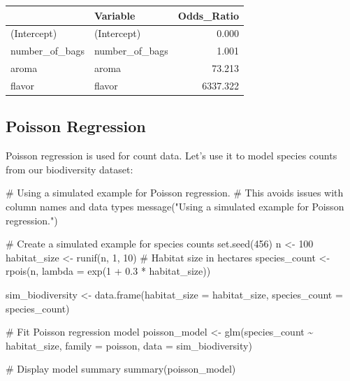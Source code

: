 \documentclass[
  letterpaper,
]{book}
\newenvironment{Shaded}{\begin{snugshade}}{\end{snugshade}}
\newcommand{\AttributeTok}[1]{\textcolor[rgb]{0.40,0.45,0.13}{#1}}
\newcommand{\CommentTok}[1]{\textcolor[rgb]{0.37,0.37,0.37}{#1}}
\newcommand{\DecValTok}[1]{\textcolor[rgb]{0.68,0.00,0.00}{#1}}
\newcommand{\FloatTok}[1]{\textcolor[rgb]{0.68,0.00,0.00}{#1}}
\newcommand{\FunctionTok}[1]{\textcolor[rgb]{0.28,0.35,0.67}{#1}}
\newcommand{\NormalTok}[1]{\textcolor[rgb]{0.00,0.23,0.31}{#1}}
\newcommand{\OtherTok}[1]{\textcolor[rgb]{0.00,0.23,0.31}{#1}}
\newcommand{\SpecialCharTok}[1]{\textcolor[rgb]{0.37,0.37,0.37}{#1}}
\newcommand{\StringTok}[1]{\textcolor[rgb]{0.13,0.47,0.30}{#1}}
\begin{document}
\begin{longtable}[]{@{}llr@{}}
\toprule\noalign{}
& Variable & Odds\_Ratio \\
\midrule\noalign{}
\endhead
\bottomrule\noalign{}
\endlastfoot
(Intercept) & (Intercept) & 0.000 \\
number\_of\_bags & number\_of\_bags & 1.001 \\
aroma & aroma & 73.213 \\
flavor & flavor & 6337.322 \\
\end{longtable}

\subsection{Poisson Regression}\label{poisson-regression}

Poisson regression is used for count data. Let's use it to model species
counts from our biodiversity dataset:

\begin{Shaded}
\begin{Highlighting}[]
\CommentTok{\# Using a simulated example for Poisson regression.}
\CommentTok{\# This avoids issues with column names and data types}
\FunctionTok{message}\NormalTok{(}\StringTok{"Using a simulated example for Poisson regression."}\NormalTok{)}

\CommentTok{\# Create a simulated example for species counts}
\FunctionTok{set.seed}\NormalTok{(}\DecValTok{456}\NormalTok{)}
\NormalTok{n }\OtherTok{\textless{}{-}} \DecValTok{100}
\NormalTok{habitat\_size }\OtherTok{\textless{}{-}} \FunctionTok{runif}\NormalTok{(n, }\DecValTok{1}\NormalTok{, }\DecValTok{10}\NormalTok{)  }\CommentTok{\# Habitat size in hectares}
\NormalTok{species\_count }\OtherTok{\textless{}{-}} \FunctionTok{rpois}\NormalTok{(n, }\AttributeTok{lambda =} \FunctionTok{exp}\NormalTok{(}\DecValTok{1} \SpecialCharTok{+} \FloatTok{0.3} \SpecialCharTok{*}\NormalTok{ habitat\_size))}

\NormalTok{sim\_biodiversity }\OtherTok{\textless{}{-}} \FunctionTok{data.frame}\NormalTok{(}\AttributeTok{habitat\_size =}\NormalTok{ habitat\_size, }\AttributeTok{species\_count =}\NormalTok{ species\_count)}

\CommentTok{\# Fit Poisson regression model}
\NormalTok{poisson\_model }\OtherTok{\textless{}{-}} \FunctionTok{glm}\NormalTok{(species\_count }\SpecialCharTok{\textasciitilde{}}\NormalTok{ habitat\_size, }\AttributeTok{family =}\NormalTok{ poisson, }\AttributeTok{data =}\NormalTok{ sim\_biodiversity)}

\CommentTok{\# Display model summary}
\FunctionTok{summary}\NormalTok{(poisson\_model)}
\end{Highlighting}
\end{Shaded}
\end{document}
